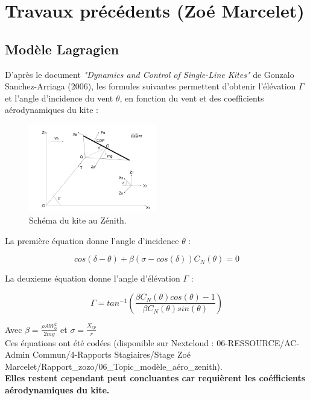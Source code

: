 \chapter{Travaux précédents (Zoé Marcelet)}
\label{ch:Ch1}

\section{Modèle Lagragien} 
\label{sec:Ch1.1}

D'après le document \textit{"Dynamics and Control of Single-Line Kites"} de Gonzalo Sanchez-Arriaga (2006),  les formules suivantes permettent d'obtenir l'élévation $\Gamma$ et l'angle d'incidence du vent $\theta$, en fonction du vent et des coefficients aérodynamiques du kite : \\

\begin{figure}[H]
    \centering
    \includegraphics[width=0.5\textwidth]{Pics/01 - Travaux précédents/Picture Sanchez.png}  
    \caption{Schéma du kite au Zénith.}
    \label{fig:sanchez}
\end{figure}

La première équation donne l’angle d’incidence $\theta$ : 
\begin{center}
    \begin{equation}
        cos(\delta - \theta) + \beta (\sigma-cos(\delta))C_N(\theta) = 0
        \label{eq:theta}
    \end{equation}
\end{center}
La deuxieme équation donne l’angle d’élévation $\Gamma$ :
\begin{center}
    \begin{equation}
        \Gamma = tan^{-1}(\frac{\beta C_N (\theta) cos(\theta)-1}{\beta C_N (\theta)sin(\theta)})
        \label{eq:gamma}
    \end{equation}
\end{center}
Avec $\beta = \frac{\rho A W_0^2}{2mg}$ et $\sigma = \frac{X_{cp}}{r}$ \\

Ces équations ont été codées (disponible sur Nextcloud : 06-RESSOURCE/AC-Admin Commun/4-Rapports Stagiaires/Stage Zoé Marcelet/Rapport\_zozo/06\_Topic\_modèle\_aéro\_zenith). \\
\textbf{Elles restent cependant peut concluantes car requièrent les coéfficients aérodynamiques du kite. }